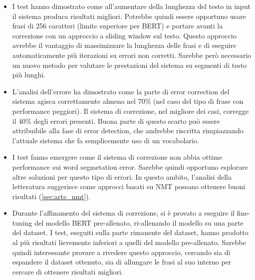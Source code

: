 \begin{itemize}
\item I test hanno dimostrato come all'aumentare della lunghezza del testo in input il sistema produca risultati migliori. Potrebbe quindi essere opportuno usare frasi di 256 caratteri (limite superiore per BERT) e portare avanti la correzione con un approccio a sliding window sul testo. Questo approccio avrebbe il vantaggio di massimizzare la lunghezza delle frasi e di eseguire automaticamente più iterazioni su errori non corretti. Sarebbe però necessario un nuovo metodo per valutare le prestazioni del sistema su segmenti di testo più lunghi.

\item L'analisi dell'errore ha dimostrato come la parte di error correction del sistema agisca correttamente almeno nel 70\% (nel caso del tipo di frase con performance peggiori). Il sistema di correzione, nel migliore dei casi, corregge il 40\% degli errori presenti. Buona parte di questo scarto può essere attribuibile alla fase di error detection, che andrebbe riscritta rimpiazzando l'attuale sistema che fa semplicemente uso di un vocabolario.

\item I test fanno emergere come il sistema di correzione non abbia ottime performance sui word segmetation error. Sarebbe quindi opportuno esplorare altre soluzioni per questo tipo di errori. In questo ambito, l'analisi della letteratura suggerisce come approcci basati su NMT possano ottenere buoni risultati (\autoref{sec:arte_nmt}).

\item Durante l'affinamento del sistema di correzione, si è provato a eseguire il fine-tuning del modello BERT pre-allenato, ri-allenando il modello su una parte del dataset. I test, eseguiti sulla parte rimanente del dataset, hanno prodotto al più risultati lievemente inferiori a quelli del modello pre-allenato. Sarebbe quindi interessante provare a rivedere questo approccio, cercando sia di espandere il dataset ottenuto, sia di allungare le frasi al suo interno per cercare di ottenere risultati migliori.







\end{itemize}